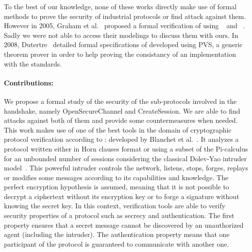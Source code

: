 To the best of our knowledge, none of these works directly make use of formal
methods to prove the security of industrial protocols or find attack against
them.
However in 2005, Graham et al.~\cite{GP05} proposed a formal verification of
\dnp using \ofmc~\cite{BMV03} and \spear~\cite{SH01}.
\TODO Sadly we were not able to access their modelings to discuss them with
ours.
In 2008, Dutertre~\cite{Dut08} detailed formal specifications of \modbus
developed using PVS, a generic theorem prover in order to help proving the
consistancy of an implementation with the standards.


\paragraph{Contributions:}

We propose a formal study of the security of
the sub-protocols involved in the \opcua handshake, namely \opcua
OpenSecureChannel and \opcua CreateSession.  We are able to find
attacks against both of them and provide some countermeasures when
needed.  This work makes use of one of the best tools in the domain of
cryptographic protocol verification according
to \cite{LP15}: \proverif developed by Blanchet et al.~\cite{Bla01}.
It analyzes a protocol written either in Horn clauses format or using
a subset of the Pi-calculus for an unbounded number of sessions
considering the classical Dolev-Yao intruder model~\cite{DY81}.  This
powerful intruder controls the network, listens, stops, forges,
replays or modifies some messages according to its capabilities and
knowledge.  The perfect encryption hypothesis is assumed, meaning that
it is not possible to decrypt a ciphertext without its encryption key
or to forge a signature without knowing the secret key.  In this
context, verification tools are able to verify security properties of
a protocol such as secrecy and authentication.  The first property
ensures that a secret message cannot be discovered by an unauthorized
agent (including the intruder).  The authentication property means
that one participant of the protocol is guaranteed to communicate with
another one.
